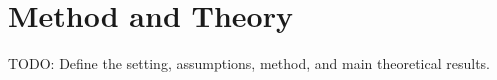 \section{Method and Theory}
\label{sec:method}

TODO: Define the setting, assumptions, method, and main theoretical results.
